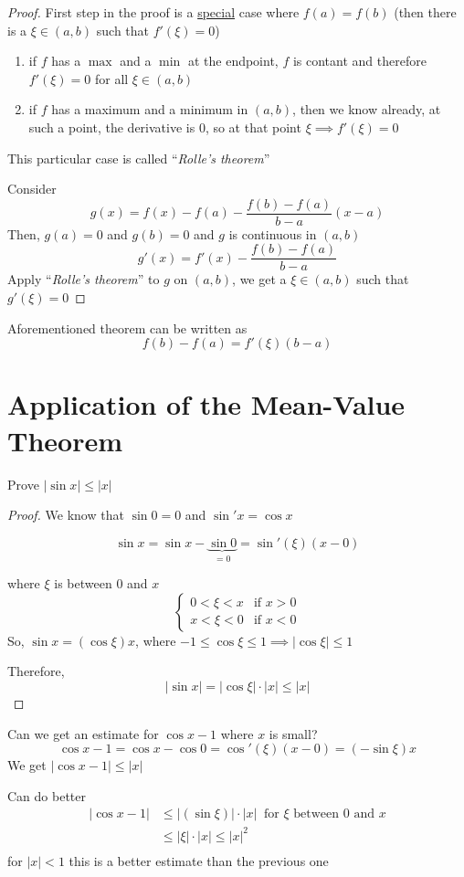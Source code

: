 \begin{proof}
  First step in the proof is a \underline{special} case where $f(a) = f(b)$
  (then there is a $\xi \in (a, b)$ such that $f'(\xi) = 0$)
  \begin{enumerate}
    \item if $f$ has a $\max$ and a $\min$ at the endpoint, $f$ is contant and therefore $f'(\xi) = 0$ for all $\xi \in (a, b)$
    \item if $f$ has a maximum and a minimum in $(a, b)$, then we know already, at such a point, the derivative is $0$,
    so at that point $\xi \implies f'(\xi) = 0$
  \end{enumerate}
  This particular case is called ``\textit{Rolle's theorem}''

  Consider $$g(x) = f(x) - f(a) - \frac{f(b) - f(a)}{b-a}(x-a)$$
  Then, $g(a) = 0$ and $g(b) = 0$ and $g$ is continuous in $(a, b)$
  $$g'(x) = f'(x) - \frac{f(b) - f(a)}{b-a}$$
  Apply ``\textit{Rolle's theorem}'' to $g$ on $(a, b)$, we get a $\xi \in (a, b)$ such that $g'(\xi) = 0$
\end{proof}

Aforementioned theorem can be written as $$f(b) - f(a) = f'(\xi) (b-a)$$

\section{Application of the Mean-Value Theorem}

\begin{example*}
  Prove $|\sin x| \leq |x|$
\end{example*}
\begin{proof}
  We know that $\sin 0 = 0$ and $\sin'x = \cos x$

  $$\sin x = \sin x - \underbrace{\sin 0}_{=0} = \sin'(\xi)(x-0)$$

  where $\xi$ is between $0$ and $x$
  $$\begin{cases}
    0 < \xi < x & \text{if } x > 0\\
    x < \xi < 0 & \text{if } x < 0
  \end{cases}$$
  So, $\sin x = (\cos \xi) x$, where $-1 \leq \cos \xi \leq 1 \implies |\cos\xi| \leq 1$

  Therefore,
  $$|\sin x| = |\cos\xi|\cdot|x| \leq |x|$$
\end{proof}

\begin{example*}
  Can we get an estimate for $\cos x - 1$ where $x$ is small?
  $$\cos x - 1 = \cos x - \cos 0 = \cos'(\xi)(x-0) = (-\sin \xi) x$$
  We get $|\cos x - 1| \leq |x|$
  
  Can do better
  \begin{align*}
    |\cos x - 1| &\leq |(\sin \xi)|\cdot|x|\ \text{ for } \xi \text{ between } 0 \text{ and } x\\
    &\leq |\xi|\cdot|x| \leq |x|^2\\
  \end{align*}
  for $|x| < 1$ this is a better estimate than the previous one
\end{example*}

